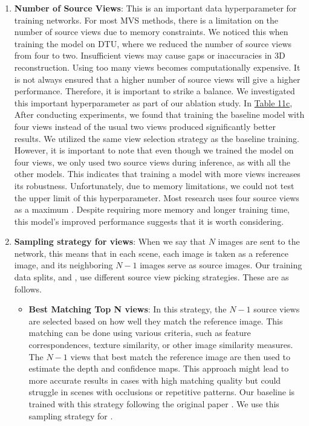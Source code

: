 \begin{enumerate}
\item \textbf{Number of Source Views}:
This is an important data hyperparameter for training {\mvs} networks. For most MVS methods, there is a limitation on the number of source views due to memory constraints. We noticed this when training the {\rmvd} model on DTU, where we reduced the number of source views from four to two. Insufficient views may cause gaps or inaccuracies in 3D reconstruction. Using too many views becomes computationally expensive. It is not always ensured that a higher number of source views will give a higher performance. Therefore, it is important to strike a balance. We investigated this important hyperparameter as part of our ablation study. In \hyperref[tab:data-prop]{Table 11c}, After conducting experiments, we found that training the baseline {\mvsn} model with four views instead of the usual two views produced significantly better results. We utilized the same view selection strategy as the baseline training. However, it is important to note that even though we trained the model on four views, we only used two source views during inference, as with all the other models. This indicates that training a model with more views increases its robustness. Unfortunately, due to memory limitations, we could not test the upper limit of this hyperparameter. Most {\mvs} research uses four source views as a maximum \cite{cao2022mvsformer, Zhang2020, GeoMVSNet}. Despite requiring more memory and longer training time, this model's improved performance suggests that it is worth considering. 
\item \textbf{Sampling strategy for views}:
When we say that $N$ images are sent to the network, this means that in each scene, each image is taken as a reference image, and its neighboring $N-1$ images serve as source images. Our training data splits, {\bms} and {\brs}, use different source view picking strategies. These are as follows. 
\begin{itemize}
    \item \textbf{Best Matching Top N views}: In this strategy, the $N - 1$ source views are selected based on how well they match the reference image. This matching can be done using various criteria, such as feature correspondences, texture similarity, or other image similarity measures. The $N - 1$ views that best match the reference image are then used to estimate the depth and confidence maps. This approach might lead to more accurate results in cases with high matching quality but could struggle in scenes with occlusions or repetitive patterns. Our baseline {\mvsn} is trained with this strategy following the original paper \cite{Yao2018}. We use this sampling strategy for {\bms}.

\end{itemize}
\end{enumerate}

